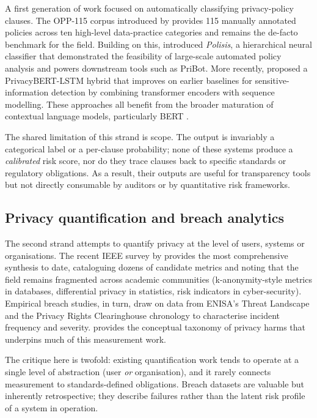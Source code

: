 \documentclass[12pt,a4paper,titlepage]{article}
\begin{document}
A first generation of work focused on automatically classifying privacy-policy clauses. The OPP-115 corpus introduced by \textcite{wilson2016opp115} provides 115 manually annotated policies across ten high-level data-practice categories and remains the de-facto benchmark for the field. Building on this, \textcite{harkous2018polisis} introduced \emph{Polisis}, a hierarchical neural classifier that demonstrated the feasibility of large-scale automated policy analysis and powers downstream tools such as PriBot. More recently, \textcite{muralitharan2024privacybertlstm} proposed a PrivacyBERT-LSTM hybrid that improves on earlier baselines for sensitive-information detection by combining transformer encoders with sequence modelling. These approaches all benefit from the broader maturation of contextual language models, particularly BERT \parencite{devlin2019bert}.

The shared limitation of this strand is scope. The output is invariably a categorical label or a per-clause probability; none of these systems produce a \emph{calibrated} risk score, nor do they trace clauses back to specific standards or regulatory obligations. As a result, their outputs are useful for transparency tools but not directly consumable by auditors or by quantitative risk frameworks.

\subsection{Privacy quantification and breach analytics}

The second strand attempts to quantify privacy at the level of users, systems or organisations. The recent IEEE survey by \textcite{arshad2024characterisation} provides the most comprehensive synthesis to date, cataloguing dozens of candidate metrics and noting that the field remains fragmented across academic communities (k-anonymity-style metrics in databases, differential privacy in statistics, risk indicators in cyber-security). Empirical breach studies, in turn, draw on data from ENISA's Threat Landscape \parencite{enisa_tl_2024} and the Privacy Rights Clearinghouse chronology \parencite{prc_breaches} to characterise incident frequency and severity. \textcite{solove2006taxonomy} provides the conceptual taxonomy of privacy harms that underpins much of this measurement work.

The critique here is twofold: existing quantification work tends to operate at a single level of abstraction (user \emph{or} organisation), and it rarely connects measurement to standards-defined obligations. Breach datasets are valuable but inherently retrospective; they describe failures rather than the latent risk profile of a system in operation.
\end{document}
